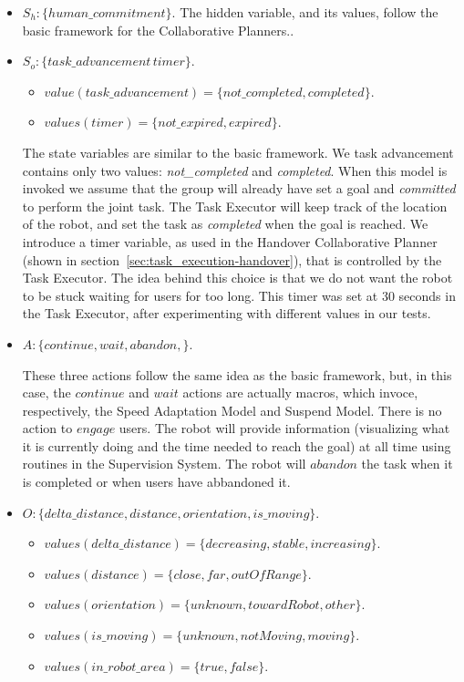 \begin{itemize}
	\item $S_h:\{human\_commitment\}$.
		The hidden variable, and its values, follow the basic framework for the Collaborative Planners..
	\item $S_o:\{task\_advancement\, timer\}$.
		\begin{itemize}
			\item $value(task\_advancement)=\{not\_completed,completed\}$.
			\item $values(timer)=\{not\_expired,expired\}$.
		\end{itemize}

		The state variables are similar to the basic framework. We task advancement contains only two values: \textit{not\_completed} and \textit{completed}. When this model is invoked we assume that the group will already have set a goal and \textit{committed} to perform the joint task.
		The Task Executor will keep track of the location of the robot, and set the task as \textit{completed} when the goal is reached.
		We introduce a timer variable, as used in the Handover Collaborative Planner (shown in section~\ref{sec:task_execution-handover}), that is controlled by the Task Executor. The idea behind this choice is that we do not want the robot to be stuck waiting for users for too long. This timer was set at 30 seconds in the Task Executor, after experimenting with different values in our tests.

	\item $A:\{continue,wait,abandon,\}$.

		These three actions follow the same idea as the basic framework, but, in this case, the $continue$ and $wait$ actions are actually macros, which invoce, respectively, the Speed Adaptation Model and Suspend Model. There is no action to $engage$ users. The robot will provide information (visualizing what it is currently doing and the time needed to reach the goal) at all time using routines in the Supervision System.
		The robot will $abandon$ the task when it is completed or when users have abbandoned it.

	\item $O:\{delta\_distance,distance,orientation,is\_moving\}$.
		\begin{itemize}
			\item $values(delta\_distance)=\{decreasing,stable,increasing\}$.
			\item $values(distance)=\{close,far,outOfRange\}$.
			\item $values(orientation)=\{unknown,towardRobot,other\}$.
			\item $values(is\_moving)=\{unknown,notMoving,moving\}$.
			\item $values(in\_robot\_area)=\{true,false\}$.
		\end{itemize}


\end{itemize}
